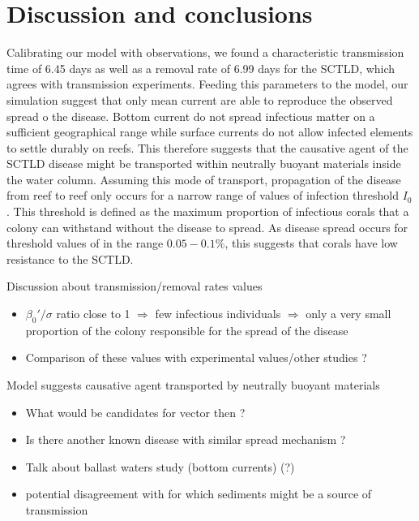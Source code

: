 \documentclass[utf8]{frontiersSCNS}
\begin{document}
\section{Discussion and conclusions}


Calibrating our model with observations, we found a characteristic transmission time of 6.45 days as well as a removal rate of 6.99 days for the SCTLD, which agrees with transmission experiments. Feeding this parameters to the model, our simulation suggest that only mean current are able to reproduce the observed spread o the disease. Bottom current do not spread infectious matter on a sufficient geographical range while surface currents do not allow infected elements to settle durably on reefs. This therefore suggests that the causative agent of the SCTLD disease might be transported within neutrally buoyant materials inside the water column. Assuming this mode of transport, propagation of the disease from reef to reef only occurs for a narrow range of values of infection threshold $I_0$. This threshold is defined as the maximum proportion of infectious corals that a colony can withstand without the disease to spread. As disease spread occurs for threshold values of in the range $0.05-0.1\%$, this suggests that corals have low resistance to the SCTLD.


Discussion about transmission/removal rates values
\begin{itemize}
    \item $\beta_0'/\sigma$ ratio close to 1 $\Rightarrow$ few infectious individuals $\Rightarrow$ only a very small proportion of the colony responsible for the spread of the disease
    \item Comparison of these values with experimental values/other studies ?
\end{itemize}

Model suggests causative agent transported by neutrally buoyant materials
\begin{itemize}
    \item What would be candidates for vector then ?
    \item Is there another known disease with similar spread mechanism ?
    \item Talk about ballast waters study (bottom currents) (?)
    \item potential disagreement with \citep{rosales2020rhodobacterales} for which sediments might be a source of transmission  
\end{itemize}
\end{document}
